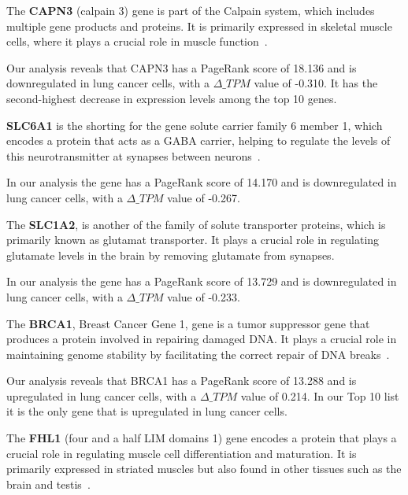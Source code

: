 The \textbf{CAPN3} (calpain 3) gene is part of the Calpain system, which includes multiple gene products and proteins.
It is primarily expressed in skeletal muscle cells, where it plays a crucial role in muscle function~\cite{Spinozzi2021Calpain}.

Our analysis reveals that CAPN3 has a PageRank score of 18.136 and is downregulated in lung cancer cells,
with a $\Delta\_TPM$ value of -0.310.
It has the second-highest decrease in expression levels among the top 10 genes.
\newline

\textbf{SLC6A1} is the shorting for the gene solute carrier family 6 member 1,
which encodes a protein that acts as a GABA carrier,
helping to regulate the levels of this neurotransmitter at synapses between neurons~\cite{Chen2020SLC6A1}.

In our analysis the gene has a PageRank score of 14.170 and is downregulated in lung cancer cells,
with a $\Delta\_TPM$ value of -0.267.
\newline

The \textbf{SLC1A2}, is another of the family of solute transporter proteins, which is primarily known as glutamat transporter.
It plays a crucial role in regulating glutamate levels in the brain by removing glutamate from synapses.\cite{NCBI2017SLC1A2}

In our analysis the gene has a PageRank score of 13.729 and is downregulated in lung cancer cells,
with a $\Delta\_TPM$ value of -0.233.
\newline

The \textbf{BRCA1}, Breast Cancer Gene 1, gene is a tumor suppressor gene that produces a protein involved in repairing damaged DNA\@.
It plays a crucial role in maintaining genome stability by facilitating the correct repair of DNA breaks~\cite{NCI2020BRCA1}.

Our analysis reveals that BRCA1 has a PageRank score of 13.288 and is upregulated in lung cancer cells,
with a $\Delta\_TPM$ value of 0.214.
In our Top 10 list it is the only gene that is upregulated in lung cancer cells.
\newline

The \textbf{FHL1} (four and a half LIM domains 1) gene encodes a protein that plays a crucial role in regulating muscle cell differentiation and maturation.
It is primarily expressed in striated muscles but also found in other tissues such as the brain and testis~\cite{Storey2020FHL1}.

